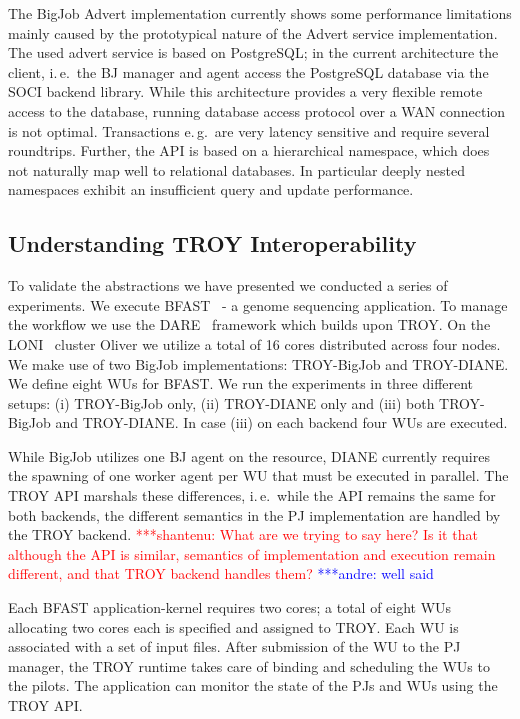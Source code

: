 \documentclass[conference,final]{IEEEtran}
\newcommand{\jhanote}[1]{ {\textcolor{red} { ***shantenu: #1 }}}
\newcommand{\alnote}[1]{ {\textcolor{blue} { ***andre: #1 }}}
\newcommand{\alnote}[1]{}
\newcommand{\jhanote}[1]{}
\begin{document}
The BigJob Advert implementation currently shows some performance limitations
mainly caused by the prototypical nature of the Advert service implementation.
The used advert service is based on PostgreSQL; in the current architecture
the client, i.\,e.\ the BJ manager and agent access the PostgreSQL database
via the SOCI backend library. While this architecture provides a very flexible
remote access to the database, running database access protocol over a WAN
connection is not optimal. Transactions e.\,g.\ are very latency sensitive and
require several roundtrips. Further, the API is based on a hierarchical 
namespace, which does not naturally map well to relational databases. In 
particular deeply nested namespaces exhibit an insufficient query and update 
performance.


\subsection{Understanding TROY Interoperability}
To validate the abstractions we have presented we conducted a series of
experiments. We execute BFAST~\cite{bfast2009} - a genome sequencing
application. To manage the workflow we use the DARE~\cite{dare-tg11} framework
which builds upon TROY. On the LONI~\cite{loni} cluster Oliver we utilize a
total of 16 cores distributed across four nodes. We make use of two BigJob
implementations: TROY-BigJob and TROY-DIANE. We define eight WUs for BFAST. We
run the experiments in three different setups: (i) TROY-BigJob only, (ii)
TROY-DIANE only and (iii) both TROY-BigJob and TROY-DIANE. In case (iii) on
each backend four WUs are executed.

While BigJob utilizes one BJ agent on the resource, DIANE
currently requires the spawning of one worker agent per WU that must be executed in
parallel.
The TROY API marshals
these differences, i.\,e.\ while the API remains the same for both backends,
the different semantics in the PJ implementation are handled by the TROY 
backend.
\jhanote{What are we trying to say here?  Is it that although the API
  is similar, semantics of implementation and execution remain
  different, and that TROY backend handles them?}\alnote{well said}

Each BFAST application-kernel requires two cores; a total of eight WUs
allocating two cores each is specified and assigned to TROY. Each WU
is associated with a set of input files. After submission of the WU to
the PJ manager, the TROY runtime takes care of binding and scheduling
the WUs to the pilots. The application can monitor the state of the
PJs and WUs using the TROY API.
\end{document}
